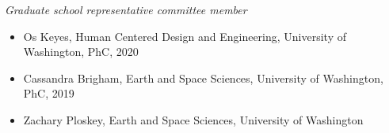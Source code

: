\medskip

\noindent\emph{Graduate school representative committee member\vspace{0.01in}}

\medskip

\begin{itemize}[noitemsep, font=$\bullet$\scshape\bfseries]

\item Os Keyes, Human Centered Design and Engineering, University of Washington, PhC, 2020

\item Cassandra Brigham, Earth and Space Sciences, University of Washington, PhC, 2019

\item Zachary Ploskey, Earth and Space Sciences, University of Washington

\end{itemize}

